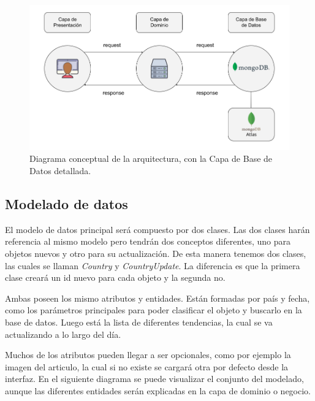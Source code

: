 \vspace{0.3cm}

\begin{figure}[H]
    \centering
    \myfloatalign
    \includegraphics[width=1\textwidth]{gfx/DiagramaRutas1.png}
    \caption[Diagrama conceptual con más detalle (1)]{Diagrama conceptual de la arquitectura, con la Capa de Base de Datos detallada.}\label{gfx:DiagramaRutas1}
\end{figure}

\subsection{Modelado de datos}
El modelo de datos principal será compuesto por dos clases. Las dos clases harán referencia al mismo modelo pero tendrán dos conceptos diferentes, uno para objetos nuevos y otro para su actualización. De esta manera tenemos dos clases, las cuales se llaman \textit{Country} y \textit{CountryUpdate}. La diferencia es que la primera clase creará un id nuevo para cada objeto y la segunda no.

\vspace{0.3cm}

Ambas poseen los mismo atributos y entidades. Están formadas por país y fecha, como los parámetros principales para poder clasificar el objeto y buscarlo en la base de datos. Luego está la lista de diferentes tendencias, la cual se va actualizando a lo largo del día.

\vspace{0.3cm}

Muchos de los atributos pueden llegar a ser opcionales, como por ejemplo la imagen del articulo, la cual si no existe se cargará otra por defecto desde la interfaz. En el siguiente diagrama se puede visualizar el conjunto del modelado, aunque las diferentes entidades serán explicadas en la capa de dominio o negocio.

